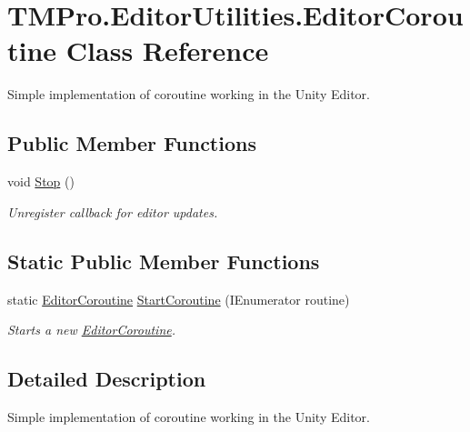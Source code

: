 \hypertarget{class_t_m_pro_1_1_editor_utilities_1_1_editor_coroutine}{}\section{T\+M\+Pro.\+Editor\+Utilities.\+Editor\+Coroutine Class Reference}
\label{class_t_m_pro_1_1_editor_utilities_1_1_editor_coroutine}


Simple implementation of coroutine working in the Unity Editor.  


\subsection*{Public Member Functions}
\begin{DoxyCompactItemize}
\item 
void \mbox{\hyperlink{class_t_m_pro_1_1_editor_utilities_1_1_editor_coroutine_ae67a02fa202696210a86e3172a423e7a}{Stop}} ()
\begin{DoxyCompactList}\small\item\em Unregister callback for editor updates. \end{DoxyCompactList}\end{DoxyCompactItemize}
\subsection*{Static Public Member Functions}
\begin{DoxyCompactItemize}
\item 
static \mbox{\hyperlink{class_t_m_pro_1_1_editor_utilities_1_1_editor_coroutine}{Editor\+Coroutine}} \mbox{\hyperlink{class_t_m_pro_1_1_editor_utilities_1_1_editor_coroutine_abab6d5eb211e23d072db7181905df57b}{Start\+Coroutine}} (I\+Enumerator routine)
\begin{DoxyCompactList}\small\item\em Starts a new \mbox{\hyperlink{class_t_m_pro_1_1_editor_utilities_1_1_editor_coroutine}{Editor\+Coroutine}}. \end{DoxyCompactList}\end{DoxyCompactItemize}


\subsection{Detailed Description}
Simple implementation of coroutine working in the Unity Editor. 



